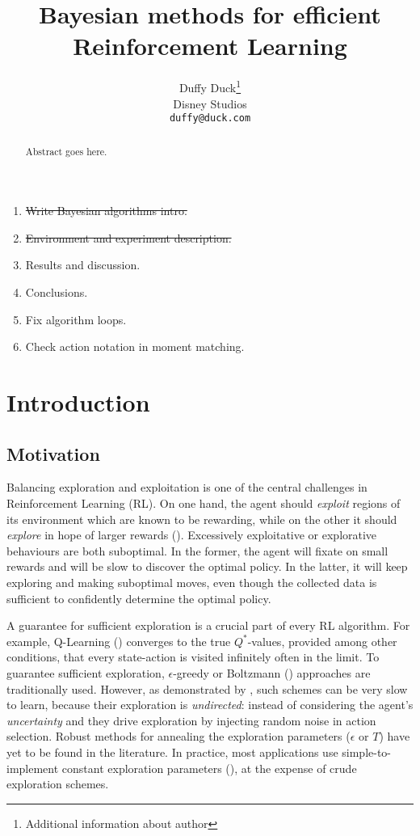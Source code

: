 \documentclass{article}
\title{Bayesian methods for efficient\\Reinforcement Learning}
\author{%
  Duffy Duck\thanks{Additional information about author} \\
  Disney Studios\\
  \texttt{duffy@duck.com} \\
}
\begin{document}
\begin{enumerate}
\item \st{Write Bayesian algorithms intro.}
\item \st{Environment and experiment description.}
\item Results and discussion.
\item Conclusions.
\item Fix algorithm loops.
\item Check action notation in moment matching.
\end{enumerate}

\clearpage
\maketitle

\begin{abstract}
  Abstract goes here.
\end{abstract}

\section{Introduction}

\subsection{Motivation}

Balancing exploration and exploitation is one of the central challenges in Reinforcement Learning (RL). On one hand, the agent should \textit{exploit} regions of its environment which are known to be rewarding, while on the other it should \textit{explore} in hope of larger rewards (\cite{suttonbarto}). Excessively exploitative or explorative behaviours are both suboptimal. In the former, the agent will fixate on small rewards and will be slow to discover the optimal policy. In the latter, it will keep exploring and making suboptimal moves, even though the collected data is sufficient to confidently determine the optimal policy.

A guarantee for sufficient exploration is a crucial part of every RL algorithm. For example, Q-Learning (\cite{qlearning}) converges to the true $Q^*$-values, provided among other conditions, that every state-action is visited infinitely often in the limit. To guarantee sufficient exploration, $\epsilon$-greedy or Boltzmann (\cite{suttonbarto}) approaches are traditionally used. However, as demonstrated by \cite{iothesis}, such schemes can be very slow to learn, because their exploration is \textit{undirected}: instead of considering the agent's \textit{uncertainty} and they drive exploration by injecting random noise in action selection. Robust methods for annealing the exploration parameters ($\epsilon$ or $T$) have yet to be found in the literature. In practice, most applications use simple-to-implement constant exploration parameters (\cite{mnihatari}), at the expense of crude exploration schemes.
\end{document}
